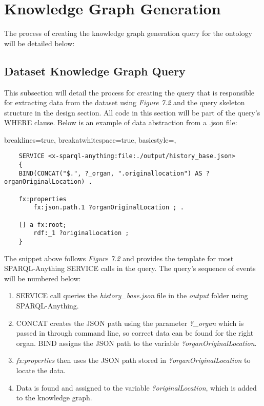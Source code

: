 \section{Knowledge Graph Generation}
\hspace*{0.5cm} The process of creating the knowledge graph generation query for the ontology will be detailed below:

\subsection{Dataset Knowledge Graph Query}
\hspace*{0.5cm} This subsection will detail the process for creating the query that is responsible for extracting data from the dataset using \textit{Figure 7.2} and the query skeleton structure in the design section. All code in this section will be part of the query's WHERE clause. Below is an example of data abstraction from a .json file:

\lstset
{
    breaklines=true,
    breakatwhitespace=true,
    basicstyle=\ttfamily,
}
\begin{lstlisting}
    SERVICE <x-sparql-anything:file:./output/history_base.json> 
    {
    BIND(CONCAT("$.", ?_organ, ".originallocation") AS ?organOriginalLocation) .

    fx:properties
        fx:json.path.1 ?organOriginalLocation ; .

    [] a fx:root; 
        rdf:_1 ?originalLocation ;
    } 
\end{lstlisting}

The snippet above follows \textit{Figure 7.2} and provides the template for most SPARQL-Anything SERVICE calls in the query. The query's sequence of events will be numbered below:

\begin{enumerate}
    \item SERVICE call queries the \textit{history\_base.json} file in the \textit{output} folder using SPARQL-Anything. 
    \item CONCAT creates the JSON path using the parameter \textit{?\_organ} which is passed in through command line, so correct data can be found for the right organ. BIND assigns the JSON path to the variable \textit{?organOriginalLocation}.
    \item \textit{fx:properties} then uses the JSON path stored in \textit{?organOriginalLocation} to locate the data.
    \item Data is found and assigned to the variable \textit{?originalLocation}, which is added to the knowledge graph.
\end{enumerate}

